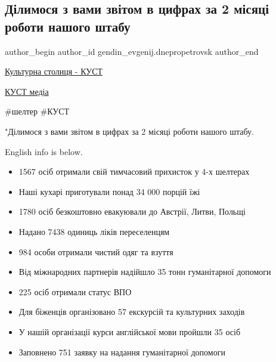  
 
 
 
 
 
\subsection{Ділимося з вами звітом в цифрах за 2 місяці роботи нашого штабу}
\label{sec:02_05_2022.fb.gendin_evgenij.dnepropetrovsk.1.zvit}
 
\ifcmt
 author_begin
   author_id gendin_evgenij.dnepropetrovsk
 author_end
\fi

\href{https://www.facebook.com/kust.dnipro}{Культурна столиця - КУСТ}

\href{https://www.facebook.com/kustdnepr}{КУСТ медіа}

\#шелтер \#КУСТ


"Ділимося з вами звітом в цифрах за 2 місяці роботи нашого штабу.

English info is below.

\begin{itemize}
  \item 1567 осіб отримали свій тимчасовий прихисток у 4-х шелтерах
  \item Наші кухарі приготували понад 34 000 порцій їжі
  \item 1780 осіб безкоштовно евакуювали до Австрії, Литви, Польщі
  \item Надано 7438 одиниць ліків переселенцям
  \item 984 особи отримали чистий одяг та взуття
  \item Від міжнародних партнерів надійшло 35 тонн гуманітарної допомоги
  \item 225 осіб отримали статус ВПО
\end{itemize}


\begin{itemize}
  \item Для біженців організовано 57 екскурсій та культурних заходів
  \item У нашій організації курси англійської мови пройшли 35 осіб
  \item Заповнено 751 заявку на надання гуманітарної допомоги
\end{itemize}


